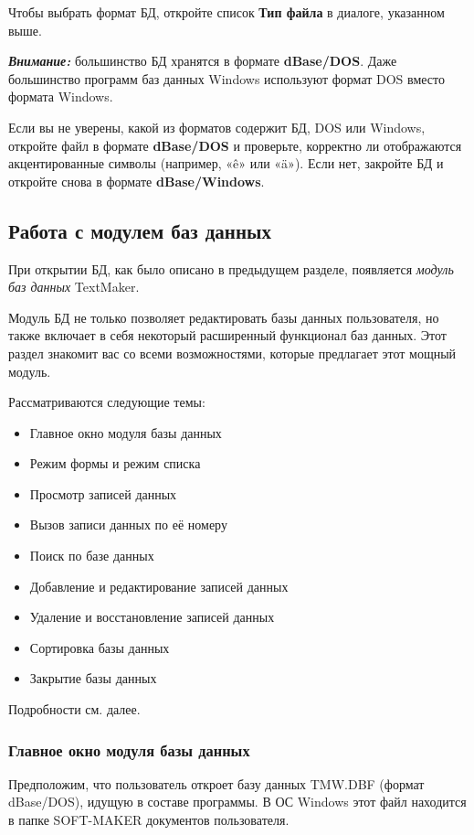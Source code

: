 ﻿\documentclass[a4paper,10pt]{article}
\begin{document}
Чтобы выбрать формат БД, откройте список \textbf{Тип файла} в диалоге, указанном выше.

\begin{mdframed}[backgroundcolor=blue!10]
\textbf{\textit{Внимание:}} большинство БД хранятся в формате \textbf{dBase/DOS}. Даже большинство программ баз данных Windows используют формат DOS вместо формата Windows.
\end{mdframed}

Если вы не уверены, какой из форматов содержит БД, DOS или Windows, откройте файл в формате \textbf{dBase/DOS} и проверьте, корректно ли отображаются акцентированные символы (например, «ê» или «ä»). Если нет, закройте БД и откройте снова в формате \textbf{dBase/Windows}.

\subsection{Работа с модулем баз данных}
При открытии БД, как было описано в предыдущем разделе, появляется \textit{модуль баз данных} TextMaker.

Модуль БД не только позволяет редактировать базы данных пользователя, но также включает в себя некоторый расширенный функционал баз данных. Этот раздел знакомит вас со всеми возможностями, которые предлагает этот мощный модуль.

Рассматриваются следующие темы:

\begin{itemize}
 \item Главное окно модуля базы данных
 \item Режим формы и режим списка
 \item Просмотр записей данных
 \item Вызов записи данных по её номеру
 \item Поиск по базе данных
 \item Добавление и редактирование записей данных
 \item Удаление и восстановление записей данных
 \item Сортировка базы данных
 \item Закрытие базы данных
\end{itemize}

Подробности см. далее.

\subsubsection{Главное окно модуля базы данных}
Предположим, что пользователь откроет базу данных TMW.DBF (формат dBase/DOS), идущую в составе программы. В ОС Windows этот файл находится в папке SOFT-MAKER документов пользователя. 
\end{document}
